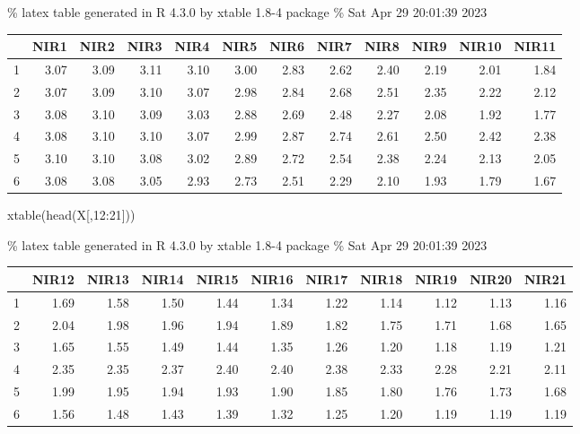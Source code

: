 \documentclass[
]{article}
\newenvironment{Shaded}{\begin{snugshade}}{\end{snugshade}}
\newcommand{\DecValTok}[1]{\textcolor[rgb]{0.00,0.00,0.81}{#1}}
\newcommand{\FunctionTok}[1]{\textcolor[rgb]{0.00,0.00,0.00}{#1}}
\newcommand{\NormalTok}[1]{#1}
\newcommand{\SpecialCharTok}[1]{\textcolor[rgb]{0.00,0.00,0.00}{#1}}
\begin{document}
\% latex table generated in R 4.3.0 by xtable 1.8-4 package \% Sat Apr
29 20:01:39 2023

\begin{table}[ht]
\centering
\begin{tabular}{rrrrrrrrrrrr}
  \hline
 & NIR1 & NIR2 & NIR3 & NIR4 & NIR5 & NIR6 & NIR7 & NIR8 & NIR9 & NIR10 & NIR11 \\ 
  \hline
1 & 3.07 & 3.09 & 3.11 & 3.10 & 3.00 & 2.83 & 2.62 & 2.40 & 2.19 & 2.01 & 1.84 \\ 
  2 & 3.07 & 3.09 & 3.10 & 3.07 & 2.98 & 2.84 & 2.68 & 2.51 & 2.35 & 2.22 & 2.12 \\ 
  3 & 3.08 & 3.10 & 3.09 & 3.03 & 2.88 & 2.69 & 2.48 & 2.27 & 2.08 & 1.92 & 1.77 \\ 
  4 & 3.08 & 3.10 & 3.10 & 3.07 & 2.99 & 2.87 & 2.74 & 2.61 & 2.50 & 2.42 & 2.38 \\ 
  5 & 3.10 & 3.10 & 3.08 & 3.02 & 2.89 & 2.72 & 2.54 & 2.38 & 2.24 & 2.13 & 2.05 \\ 
  6 & 3.08 & 3.08 & 3.05 & 2.93 & 2.73 & 2.51 & 2.29 & 2.10 & 1.93 & 1.79 & 1.67 \\ 
   \hline
\end{tabular}
\end{table}

\begin{Shaded}
\begin{Highlighting}[]
\FunctionTok{xtable}\NormalTok{(}\FunctionTok{head}\NormalTok{(X[,}\DecValTok{12}\SpecialCharTok{:}\DecValTok{21}\NormalTok{]))}
\end{Highlighting}
\end{Shaded}

\% latex table generated in R 4.3.0 by xtable 1.8-4 package \% Sat Apr
29 20:01:39 2023

\begin{table}[ht]
\centering
\begin{tabular}{rrrrrrrrrrr}
  \hline
 & NIR12 & NIR13 & NIR14 & NIR15 & NIR16 & NIR17 & NIR18 & NIR19 & NIR20 & NIR21 \\ 
  \hline
1 & 1.69 & 1.58 & 1.50 & 1.44 & 1.34 & 1.22 & 1.14 & 1.12 & 1.13 & 1.16 \\ 
  2 & 2.04 & 1.98 & 1.96 & 1.94 & 1.89 & 1.82 & 1.75 & 1.71 & 1.68 & 1.65 \\ 
  3 & 1.65 & 1.55 & 1.49 & 1.44 & 1.35 & 1.26 & 1.20 & 1.18 & 1.19 & 1.21 \\ 
  4 & 2.35 & 2.35 & 2.37 & 2.40 & 2.40 & 2.38 & 2.33 & 2.28 & 2.21 & 2.11 \\ 
  5 & 1.99 & 1.95 & 1.94 & 1.93 & 1.90 & 1.85 & 1.80 & 1.76 & 1.73 & 1.68 \\ 
  6 & 1.56 & 1.48 & 1.43 & 1.39 & 1.32 & 1.25 & 1.20 & 1.19 & 1.19 & 1.19 \\ 
   \hline
\end{tabular}
\end{table}
\end{document}

